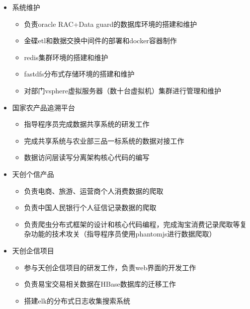 \documentclass{resume}
\begin{document}
\begin{itemize}
  \item 系统维护
  \begin{itemize}
    \item 负责oracle RAC+Data guard的数据库环境的搭建和维护
    \item 金碟etl和数据交换中间件的部署和docker容器制作
    \item redis集群环境的搭建和维护
    \item fastdfs分布式存储环境的搭建和维护
    \item 对部门vsphere虚拟服务器（数十台虚拟机）集群进行管理和维护
  \end{itemize}
  \item 国家农产品追溯平台
  \begin{itemize}
    \item 指导程序员完成数据共享系统的研发工作
    \item 完成共享系统与农业部三品一标系统的数据对接工作
    \item 数据访问层读写分离架构核心代码的编写
  \end{itemize}
\end{itemize}

\begin{itemize}
  \item 天创个信产品
  \begin{itemize}
    \item 负责电商、旅游、运营商个人消费数据的爬取
    \item 负责中国人民银行个人征信记录数据的爬取
    \item 负责爬虫分布式框架的设计和核心代码编程，完成淘宝消费记录爬取等复杂功能的技术攻关（指导程序员使用phantomjs进行数据爬取）
  \end{itemize}
  \item 天创企信项目
  \begin{itemize}
    \item 参与天创企信项目的研发工作，负责web界面的开发工作
    \item 负责易宝交易相关数据在HBase数据库的迁移工作
    \item 搭建elk的分布式日志收集搜索系统
  \end{itemize}
\end{itemize}
\end{document}
